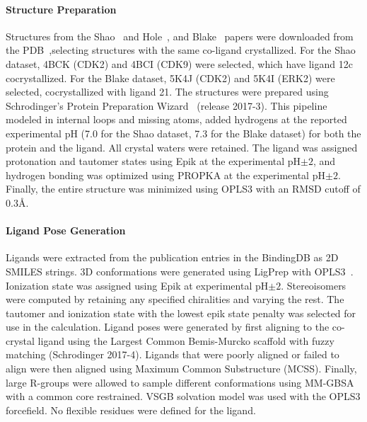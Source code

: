 \documentclass[9pt,lineno]{elife-modified} %
\begin{document}
\paragraph{Structure Preparation}
Structures from the Shao~\citep{Shao2013-oe} and Hole~\citep{Hole2013-sr}, and Blake~\citep{Blake2016-su} papers were downloaded from the PDB~\citep{Berman2002-hg},selecting structures with the same co-ligand crystallized. For the Shao dataset, 4BCK (CDK2) and 4BCI (CDK9) were selected, which have ligand 12c cocrystallized. For the Blake dataset, 5K4J (CDK2) and 5K4I (ERK2) were selected, cocrystallized with ligand 21. The structures were prepared using Schrodinger’s Protein Preparation Wizard~\citep{Sastry2013-ax} (release 2017-3). This pipeline modeled in internal loops and missing atoms, added hydrogens at the reported experimental pH (7.0 for the Shao dataset, 7.3 for the Blake dataset) for both the protein and the ligand. All crystal waters were retained. The ligand was assigned protonation and tautomer states using Epik at the experimental pH$\pm2$, and hydrogen bonding was optimized using PROPKA at the experimental pH$\pm2$. Finally, the entire structure was minimized using OPLS3 with an RMSD cutoff of 0.3\AA.

\paragraph{Ligand Pose Generation}
Ligands were extracted from the publication entries in the BindingDB as  2D SMILES strings. 3D conformations were generated using LigPrep with OPLS3~\citep{Harder2016-zn}. Ionization state was assigned using Epik at experimental pH$\pm2$. Stereoisomers were computed by retaining any specified chiralities and varying the rest. The tautomer and ionization state with the lowest epik state penalty was selected for use in the calculation. Ligand poses were generated by first aligning to the co-crystal ligand using the Largest Common Bemis-Murcko scaffold with fuzzy matching (Schrodinger 2017-4). Ligands that were poorly aligned or failed to align were then aligned using Maximum Common Substructure (MCSS). Finally, large R-groups were allowed to sample different conformations using MM-GBSA with a common core restrained. VSGB solvation model was used with the OPLS3 forcefield. No flexible residues were defined for the ligand. 
\end{document}
